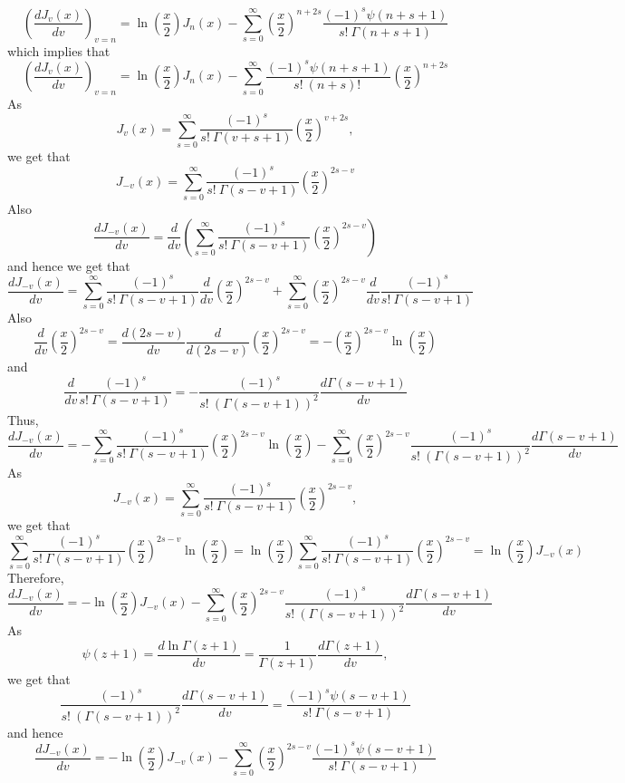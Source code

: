 \documentclass{article}
\begin{document}
\begin{flushleft}
$$\left(\frac{d J_{v}(x)}{d v}\right)_{v=n}=\ln \left(\frac{x}{2}\right) J_{n}(x)-\sum_{s=0}^{\infty}\left(\frac{x}{2}\right)^{n+2 s} \frac{(-1)^{s} \psi(n+s+1)}{s ! \  \Gamma(n+s+1)}$$
which implies that
$$\left(\frac{d J_{v}(x)}{d v}\right)_{v=n}=\ln \left(\frac{x}{2}\right) J_{n}(x)-\sum_{s=0}^{\infty} \frac{(-1)^{s} \psi(n+s+1)}{s ! \ (n+s) ! \ }\left(\frac{x}{2}\right)^{n+2 s}$$
As 
$$J_{v}(x)=\sum_{s=0}^{\infty} \frac{(-1)^{s}}{s ! \  \Gamma(v+s+1)}\left(\frac{x}{2}\right)^{v+2 s},$$
we get that 
$$J_{-v}(x)=\sum_{s=0}^{\infty} \frac{(-1)^{s}}{s ! \  \Gamma(s-v+1)}\left(\frac{x}{2}\right)^{2 s-v}$$
Also 
$$\frac{d J_{-v}(x)}{d v}=\frac{d}{d v}\left(\sum_{s=0}^{\infty} \frac{(-1)^{s}}{s ! \  \Gamma(s-v+1)}\left(\frac{x}{2}\right)^{2 s-v}\right)$$ 
and hence we get that
$$\frac{d J_{-v}(x)}{d v}=\sum_{s=0}^{\infty} \frac{(-1)^{s}}{s ! \  \Gamma(s-v+1)} \frac{d}{d v}\left(\frac{x}{2}\right)^{2 s-v}+\sum_{s=0}^{\infty}\left(\frac{x}{2}\right)^{2 s-v} \frac{d}{d v} \frac{(-1)^{s}}{s ! \  \Gamma(s-v+1)}$$
Also 
$$\frac{d}{d v}\left(\frac{x}{2}\right)^{2 s-v}=\frac{d(2 s-v)}{d v} \frac{d}{d(2 s-v)}\left(\frac{x}{2}\right)^{2 s-v}=-\left(\frac{x}{2}\right)^{2 s-v} \ln \left(\frac{x}{2}\right)$$
and
$$\frac{d}{d v} \frac{(-1)^{s}}{s ! \  \Gamma(s-v+1)}=-\frac{(-1)^{s}}{s ! \ (\Gamma(s-v+1))^{2}} \frac{d \Gamma(s-v+1)}{d v}$$
Thus, 
$$\frac{d J_{-v}(x)}{d v}=-\sum_{s=0}^{\infty} \frac{(-1)^{s}}{s ! \  \Gamma(s-v+1)}\left(\frac{x}{2}\right)^{2 s-v} \ln \left(\frac{x}{2}\right)-\sum_{s=0}^{\infty}\left(\frac{x}{2}\right)^{2 s-v} \frac{(-1)^{s}}{s ! \ (\Gamma(s-v+1))^{2}} \frac{d \Gamma(s-v+1)}{d v}$$
As 
$$J_{-v}(x)=\sum_{s=0}^{\infty} \frac{(-1)^{s}}{s ! \  \Gamma(s-v+1)}\left(\frac{x}{2}\right)^{2 s-v},$$ 
we get that
$$\sum_{s=0}^{\infty} \frac{(-1)^{s}}{s ! \  \Gamma(s-v+1)}\left(\frac{x}{2}\right)^{2 s-v} \ln \left(\frac{x}{2}\right)=\ln \left(\frac{x}{2}\right) \sum_{s=0}^{\infty} \frac{(-1)^{s}}{s ! \  \Gamma(s-v+1)}\left(\frac{x}{2}\right)^{2 s-v}=\ln \left(\frac{x}{2}\right) J_{-v}(x)$$
Therefore, 
$$\frac{d J_{-v}(x)}{d v}=-\ln \left(\frac{x}{2}\right) J_{-v}(x)-\sum_{s=0}^{\infty}\left(\frac{x}{2}\right)^{2 s-v} \frac{(-1)^{s}}{s ! \ (\Gamma(s-v+1))^{2}} \frac{d \Gamma(s-v+1)}{d v}$$
As 
$$\psi(z+1)=\frac{d \ln \Gamma(z+1)}{d v}=\frac{1}{\Gamma(z+1)} \frac{d \Gamma(z+1)}{d v},$$ 
we get that
$$\frac{(-1)^{s}}{s ! \ (\Gamma(s-v+1))^{2}} \frac{d \Gamma(s-v+1)}{d v}=\frac{(-1)^{s} \psi(s-v+1)}{s ! \  \Gamma(s-v+1)}$$ 
and hence
$$\frac{d J_{-v}(x)}{d v}=-\ln \left(\frac{x}{2}\right) J_{-v}(x)-\sum_{s=0}^{\infty}\left(\frac{x}{2}\right)^{2 s-v} \frac{(-1)^{s} \psi(s-v+1)}{s ! \  \Gamma(s-v+1)}$$

\end{flushleft}
\end{document}
